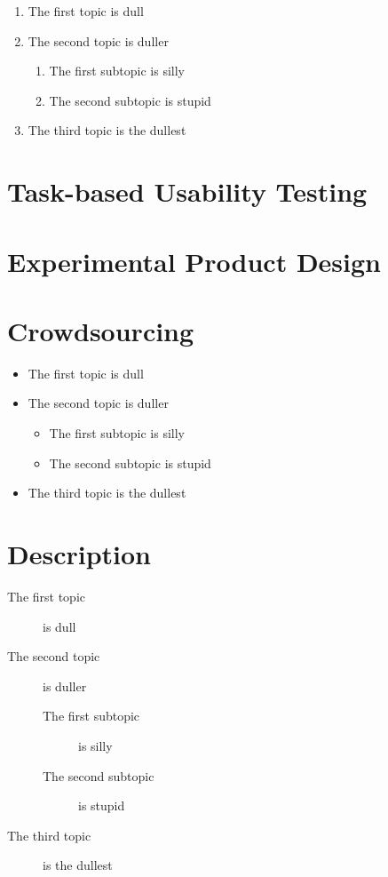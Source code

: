 \begin{enumerate}
\item The first topic is dull
\item The second topic is duller
\begin{enumerate}
\item The first subtopic is silly
\item The second subtopic is stupid
\end{enumerate}
\item The third topic is the dullest
\end{enumerate}

\section{Task-based Usability Testing}
\label{background:section:task}

\section{Experimental Product Design}
\label{background:section:experimentproduct}

\section{Crowdsourcing}
\label{background:section:crowdsourcing}

\begin{itemize}
\item The first topic is dull
\item The second topic is duller
\begin{itemize}
\item The first subtopic is silly
\item The second subtopic is stupid
\end{itemize}
\item The third topic is the dullest
\end{itemize}

\section*{Description}
\begin{description}
\item[The first topic] is dull
\item[The second topic] is duller
\begin{description}
\item[The first subtopic] is silly
\item[The second subtopic] is stupid
\end{description}
\item[The third topic] is the dullest
\end{description}

